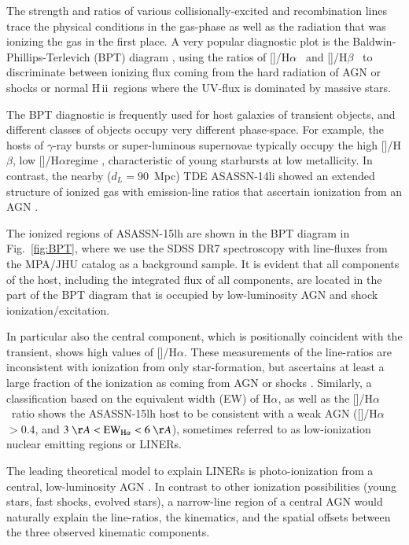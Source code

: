 \documentclass[traditabstract]{aa}
\newcommand{\hb}{H$\beta$}
\newcommand{\ha}{H$\alpha$}
\newcommand{\hii}{\mbox{H\,{\sc ii}}}
\newcommand{\oiii}{[\ion{O}{iii}]}
\newcommand{\nii}{[\ion{N}{ii}]}
\begin{document}
The strength and ratios of various collisionally-excited and recombination lines trace the physical conditions in the gas-phase as well as the radiation that was ionizing the gas in the first place. A very popular diagnostic plot is the Baldwin-Phillips-Terlevich (BPT) diagram \citep{1981PASP...93....5B}, using the ratios of \nii/\ha~ and \oiii/\hb~ to discriminate between ionizing flux coming from the hard radiation of AGN or shocks or normal \hii~regions where the UV-flux is dominated by massive stars. 

The BPT diagnostic is frequently used for host galaxies of transient objects, and different classes of objects occupy very different phase-space. For example, the hosts of $\gamma$-ray bursts or super-luminous supernovae typically occupy the high \oiii/\hb, low \nii/\ha regime \citep{2015A&A...581A.125K, 2015MNRAS.449..917L}, characteristic of young starbursts at low metallicity. In contrast, the nearby ($d_L=90$~Mpc) TDE ASASSN-14li \citep{2016MNRAS.455.2918H} showed an extended structure of ionized gas with emission-line ratios that ascertain ionization from an AGN \citep{2016ApJ...830L..32P}.

The ionized regions of ASASSN-15lh are shown in the BPT diagram in Fig.~\ref{fig:BPT}, where we use the SDSS DR7 spectroscopy \citep{2009ApJS..182..543A} with line-fluxes from the MPA/JHU catalog as a background sample. It is evident that all components of the host, including the integrated flux of all components, are located in the part of the BPT diagram that is occupied by low-luminosity AGN and shock ionization/excitation.

In particular also the central component, which is positionally coincident with the transient, shows high values of \nii/\ha. These measurements of the line-ratios are inconsistent with ionization from only star-formation, but ascertains at least a large fraction of the ionization as coming from AGN or shocks \citep{2011MNRAS.413.1687C}. Similarly, a classification based on the equivalent width (EW) of \ha, as well as the \nii/\ha~ratio \citep{2011MNRAS.413.1687C} shows the ASASSN-15lh host to be consistent with a weak AGN (\nii/\ha~$>0.4$, and $3~\AA < \mathrm{EW}_{\mathrm{H}\alpha} < 6~\AA$), sometimes referred to as low-ionization nuclear emitting regions or LINERs.

The leading theoretical model to explain LINERs is photo-ionization from a central, low-luminosity AGN \citep[e.g.,][for a review]{2008ARA&A..46..475H}. In contrast to other ionization possibilities (young stars, fast shocks, evolved stars), a narrow-line region of a central AGN would naturally explain the line-ratios, the kinematics, and the spatial offsets between the three observed kinematic components.
\end{document}

